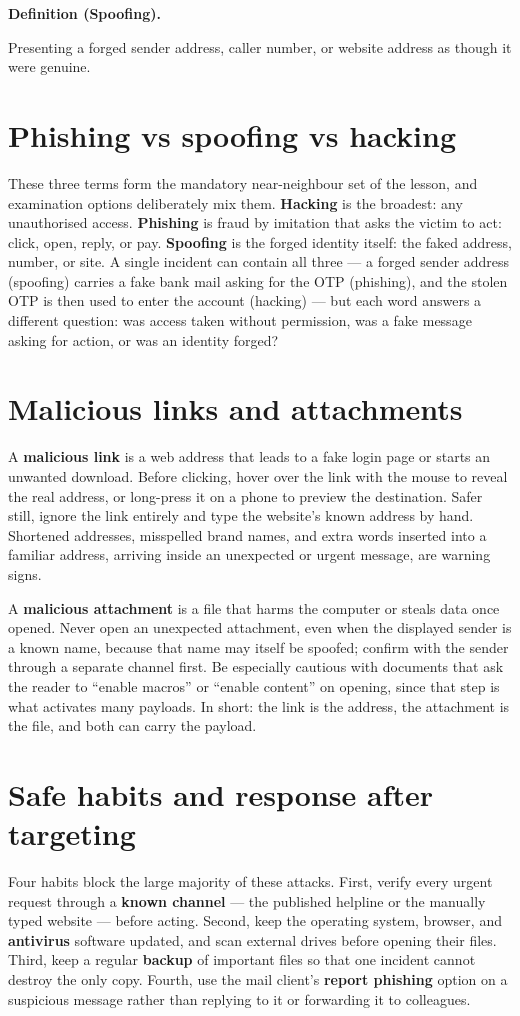 \documentclass[11pt]{article}
\newenvironment{definitionbox}[1]{%
  \par\noindent\textbf{Definition (#1).}\ \itshape
}{\par\vspace{0.3em}}
\begin{document}
\begin{definitionbox}{Spoofing}
Presenting a forged sender address, caller number, or website address
as though it were genuine.
\end{definitionbox}

\section{Phishing vs spoofing vs hacking}
These three terms form the mandatory near-neighbour set of the lesson,
and examination options deliberately mix them. \textbf{Hacking} is the
broadest: any unauthorised access. \textbf{Phishing} is fraud by
imitation that asks the victim to act: click, open, reply, or pay.
\textbf{Spoofing} is the forged identity itself: the faked address,
number, or site. A single incident can contain all three --- a forged
sender address (spoofing) carries a fake bank mail asking for the OTP
(phishing), and the stolen OTP is then used to enter the account
(hacking) --- but each word answers a different question: was access
taken without permission, was a fake message asking for action, or was
an identity forged?

\section{Malicious links and attachments}
A \textbf{malicious link} is a web address that leads to a fake login
page or starts an unwanted download. Before clicking, hover over the
link with the mouse to reveal the real address, or long-press it on a
phone to preview the destination. Safer still, ignore the link entirely
and type the website's known address by hand. Shortened addresses,
misspelled brand names, and extra words inserted into a familiar
address, arriving inside an unexpected or urgent message, are warning
signs.

A \textbf{malicious attachment} is a file that harms the computer or
steals data once opened. Never open an unexpected attachment, even when
the displayed sender is a known name, because that name may itself be
spoofed; confirm with the sender through a separate channel first. Be
especially cautious with documents that ask the reader to ``enable
macros'' or ``enable content'' on opening, since that step is what
activates many payloads. In short: the link is the address, the
attachment is the file, and both can carry the payload.

\section{Safe habits and response after targeting}
Four habits block the large majority of these attacks. First, verify
every urgent request through a \textbf{known channel} --- the published
helpline or the manually typed website --- before acting. Second, keep
the operating system, browser, and \textbf{antivirus} software updated,
and scan external drives before opening their files. Third, keep a
regular \textbf{backup} of important files so that one incident cannot
destroy the only copy. Fourth, use the mail client's \textbf{report
phishing} option on a suspicious message rather than replying to it or
forwarding it to colleagues.
\end{document}
